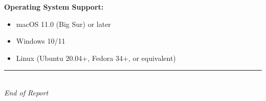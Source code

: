 \documentclass[12pt,a4paper]{article}
\begin{document}
\textbf{Operating System Support:}
\begin{itemize}
    \item macOS 11.0 (Big Sur) or later
    \item Windows 10/11
    \item Linux (Ubuntu 20.04+, Fedora 34+, or equivalent)
\end{itemize}

\vspace{2em}
\begin{center}
\rule{0.5\textwidth}{0.4pt}\\[0.5em]
\textit{End of Report}
\end{center}
\end{document}
